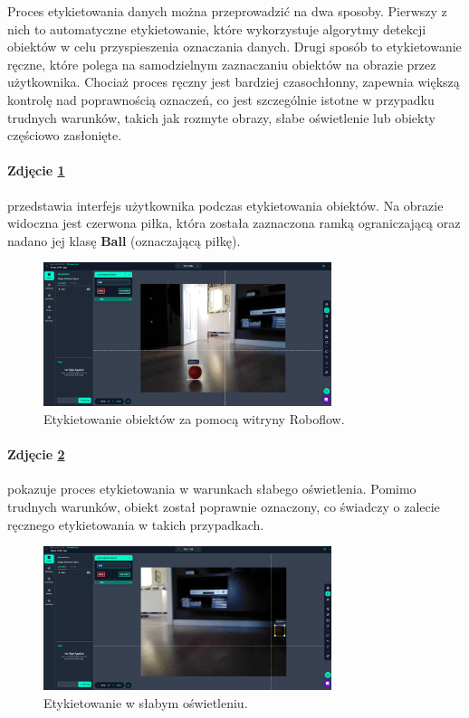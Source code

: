 \documentclass[a4paper,twoside,12pt]{book}
\begin{document}
Proces etykietowania danych można przeprowadzić na dwa sposoby. Pierwszy z nich to automatyczne etykietowanie, które wykorzystuje algorytmy detekcji obiektów w celu przyspieszenia oznaczania danych. Drugi sposób to etykietowanie ręczne, które polega na samodzielnym zaznaczaniu obiektów na obrazie przez użytkownika. Chociaż proces ręczny jest bardziej czasochłonny, zapewnia większą kontrolę nad poprawnością oznaczeń, co jest szczególnie istotne w przypadku trudnych warunków, takich jak rozmyte obrazy, słabe oświetlenie lub obiekty częściowo zasłonięte.

\newpage

\paragraph{Zdjęcie \ref{fig:labeling1}}
przedstawia interfejs użytkownika podczas etykietowania obiektów. Na obrazie widoczna jest czerwona piłka, która została zaznaczona ramką ograniczającą oraz nadano jej klasę \textbf{Ball} (oznaczającą piłkę).

\begin{figure}[h]
	\centering
	\includegraphics[width=0.75\textwidth]{Images/Roboflow/labeling1.png}
	\caption{Etykietowanie obiektów za pomocą witryny Roboflow.}
	\label{fig:labeling1}
\end{figure}

\paragraph{Zdjęcie \ref{fig:labeling3}}
pokazuje proces etykietowania w warunkach słabego oświetlenia. Pomimo trudnych warunków, obiekt został poprawnie oznaczony, co świadczy o zalecie ręcznego etykietowania w takich przypadkach.

\begin{figure}[h]
    \centering
    \includegraphics[width=0.75\textwidth]{Images/Roboflow/labeling3.png}
    \caption{Etykietowanie w słabym oświetleniu.}
    \label{fig:labeling3}
\end{figure}
\end{document}
